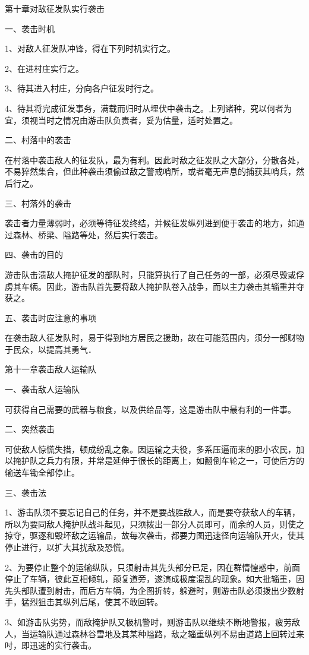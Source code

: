 第十章对敌征发队实行袭击

一、袭击时机

1、对敌人征发队冲锋，得在下列时机实行之。

2、在进村庄实行之。

3、待其进入村庄，分向各户征发时行之。

4、待其将完成征发事务，满载而归时从埋伏中袭击之。上列诸种，究以何者为宜，须视当时之情况由游击队负责者，妥为估量，适时处置之。

二、村落中的袭击

在村落中袭击敌人的征发队，最为有利。因此时敌之征发队之大部分，分散各处，不易猝然集合，但此种袭击须偷过敌之警戒哨所，或者毫无声息的捕获其哨兵，然后行之。

三、村落外的袭击

袭击者力量薄弱时，必须等待征发终结，并候征发纵列进到便于袭击的地方，如通过森林、桥梁、隘路等处，然后实行袭击。

四、袭击的目的

游击队击溃敌人掩护征发的部队时，只能算执行了自己任务的一部，必须尽毁或俘虏其车辆。因此，游击队首先要将敌人掩护队卷入战争，而以主力袭击其辎重并夺获之。

五、袭击时应注意的事项

在袭击敌人征发队时，易于得到地方居民之援助，故在可能范围内，须分一部财物于民众，以提高其勇气．

第十一章袭击敌人运输队

一、袭击敌人运输队

可获得自己需要的武器与粮食，以及供给品等，这是游击队中最有利的一件事。

二、突然袭击

可使敌人惊慌失措，顿成纷乱之象。因运输之夫役，多系压逼而来的胆小农民，加以掩护队之兵力有限，并常是延伸于很长的距离上，如翻倒车轮之一，可使后方的输送车锄全部停止。

三、袭击法

1、游击队须不要忘记自己的任务，并不是要战胜敌人，而是要夺获敌人的车辆，所以为要同敌人掩护队战斗起见，只须拨出一部分人员即可，而余的人员，则使之掠夺，驱逐和毁坏敌之运输品，故每次袭击，都要力图迅速径向运输队开火，使其停止进行，以扩大其扰敌及恐慌。


2、为要停止整个的运输纵队，只须射击其先头部分已足，因在群情惶惑中，前面停止了车辆，彼此互相倾轧，颠复道旁，遂演成极度混乱的现象。如大批辎重，因先头部队遭到射击，而后方车辆，为企图折转，躲避时，则游击队必须拨出少数射手，猛烈狙击其纵列后尾，使其不敢回转。

3、如游击队劣势，而敌掩护队又极机警时，则游击队以继续不断地警报，疲劳敌人，当运输队通过森林谷雪地及其某种隘路，敌之辎重纵列不易由道路上回转过来吋，即迅速的实行袭击。

